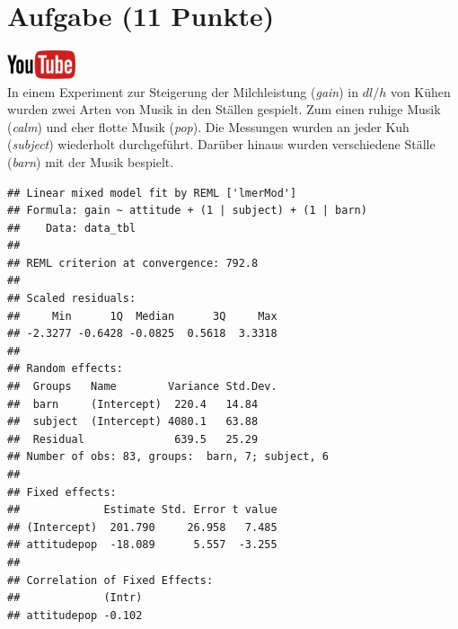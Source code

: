 \documentclass[a4paper, 10pt]{scrartcl}\usepackage[]{graphicx}\usepackage[]{xcolor}
\makeatletter
\newenvironment{kframe}{%
 \def\at@end@of@kframe{}%
 \ifinner\ifhmode%
  \def\at@end@of@kframe{\end{minipage}}%
  \begin{minipage}{\columnwidth}%
 \fi\fi%
 \def\FrameCommand##1{\hskip\@totalleftmargin \hskip-\fboxsep
 \colorbox{shadecolor}{##1}\hskip-\fboxsep
     \hskip-\linewidth \hskip-\@totalleftmargin \hskip\columnwidth}%
 \MakeFramed {\advance\hsize-\width
   \@totalleftmargin\z@ \linewidth\hsize
   \@setminipage}}%
 {\par\unskip\endMakeFramed%
 \at@end@of@kframe}
\newenvironment{knitrout}{}{} %
\makeatother
\begin{document}
\clearpage

\section{Aufgabe \hfill (11 Punkte)}

\hfill\href{https://youtu.be/ysai7umvPoA}{\includegraphics[width =
  2cm]{img/youtube}}\\[1Ex]


In einem Experiment zur Steigerung der Milchleistung (\textit{gain}) in $dl/h$ von
K{\"u}hen wurden zwei Arten von Musik in den St{\"a}llen gespielt. Zum einen ruhige
Musik (\textit{calm}) und eher flotte Musik (\textit{pop}). Die Messungen
wurden an jeder Kuh (\textit{subject}) wiederholt durchgef{\"u}hrt. Dar{\"u}ber
hinaus wurden verschiedene St{\"a}lle (\textit{barn}) mit der Musik bespielt.

\begin{knitrout}
\color{fgcolor}\begin{kframe}
\begin{verbatim}
## Linear mixed model fit by REML ['lmerMod']
## Formula: gain ~ attitude + (1 | subject) + (1 | barn)
##    Data: data_tbl
## 
## REML criterion at convergence: 792.8
## 
## Scaled residuals: 
##     Min      1Q  Median      3Q     Max 
## -2.3277 -0.6428 -0.0825  0.5618  3.3318 
## 
## Random effects:
##  Groups   Name        Variance Std.Dev.
##  barn     (Intercept)  220.4   14.84   
##  subject  (Intercept) 4080.1   63.88   
##  Residual              639.5   25.29   
## Number of obs: 83, groups:  barn, 7; subject, 6
## 
## Fixed effects:
##             Estimate Std. Error t value
## (Intercept)  201.790     26.958   7.485
## attitudepop  -18.089      5.557  -3.255
## 
## Correlation of Fixed Effects:
##             (Intr)
## attitudepop -0.102
\end{verbatim}
\end{kframe}
\end{knitrout}
\end{document}
